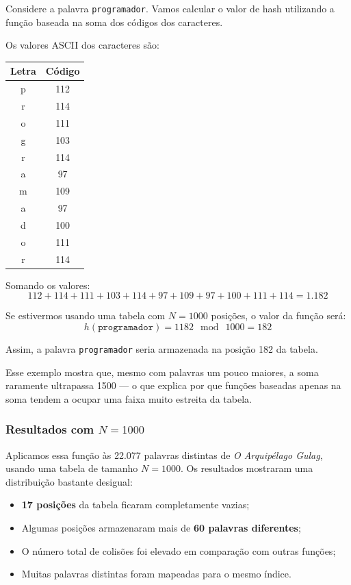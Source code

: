 \begin{example}
Considere a palavra \texttt{programador}. 
Vamos calcular o valor de hash utilizando a função baseada na soma dos códigos dos caracteres.

Os valores ASCII dos caracteres são:

\begin{center}
\begin{tabular}{c|c}
Letra & Código \\
\hline
p & 112 \\
r & 114 \\
o & 111 \\
g & 103 \\
r & 114 \\
a & 97 \\
m & 109 \\
a & 97 \\
d & 100 \\
o & 111 \\
r & 114 \\
\end{tabular}
\end{center}


Somando os valores:
\[
112 + 114 + 111 + 103 + 114 + 97 + 109 + 97 + 100 + 111 + 114 = 1.182
\]

Se estivermos usando uma tabela com $N = 1000$ posições, o valor da função será:
\[
h(\texttt{programador}) = 1182\ \bmod\ 1000 = 182
\]

Assim, a palavra \texttt{programador} seria armazenada na posição 182 da tabela.

Esse exemplo mostra que, mesmo com palavras um pouco maiores, a soma raramente ultrapassa 1500 — o que explica por que funções baseadas apenas na soma tendem a ocupar uma faixa muito estreita da tabela.

\end{example}

\subsubsection*{Resultados com $N = 1000$}

Aplicamos essa função às 22.077 palavras distintas de \emph{O Arquipélago Gulag}, usando uma tabela de tamanho $N = 1000$. 
Os resultados mostraram uma distribuição bastante desigual:

\begin{itemize}
  \item \textbf{17 posições} da tabela ficaram completamente vazias;
  \item Algumas posições armazenaram mais de \textbf{60 palavras diferentes};
  \item O número total de colisões foi elevado em comparação com outras funções;
  \item Muitas palavras distintas foram mapeadas para o mesmo índice.
\end{itemize}

